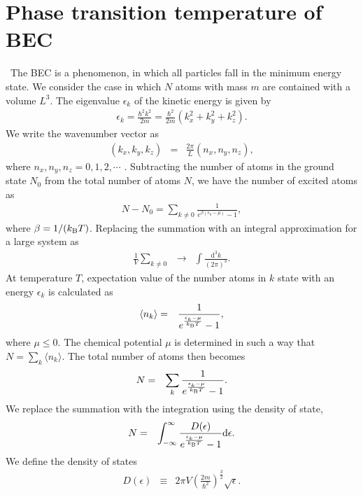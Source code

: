\documentclass[12pt,a4paper]{report}
\newcommand{\diff}{\mathrm{d}}				            %
\newcommand{\kb} {k_{\rm B}}				            %
\begin{document}
\section{Phase transition temperature of BEC}
\ The BEC is a phenomenon, in which all particles fall in the minimum energy state.
We consider the case in which $N$ atoms with mass $m$ are contained with a volume $L^3$.
The eigenvalue $\epsilon_k$ of the kinetic energy is given by
\begin{eqnarray}
\epsilon_k = \frac{\hbar^2 k^2}{2m} = \frac{\hbar^2}{2m}(k_x^2+k_y^2+k_z^2).
\end{eqnarray}
We write the wavenumber vector as
\begin{eqnarray}
(k_x, k_y, k_z) & = & \frac{2 \pi}{L}(n_x, n_y, n_z),
\end{eqnarray}
where $n_x,n_y,n_z = 0, 1, 2, \cdots$ .
Subtracting the number of atoms in the ground state $N_0$ from the total number of atoms $N$,
we have the number of excited atoms as
\begin{eqnarray}
N - N_0 = \sum_{k \neq 0} \frac{1}{ e^{\beta (\epsilon_k - \mu)} - 1},
\end{eqnarray}
where $\beta = 1/(\kb T)$.
Replacing the summation with an integral approximation for a large system as
\begin{eqnarray}
\frac{1}{V} \sum_{k \neq 0} & \rightarrow & \int \frac{\diff^3 k}{(2 \pi)^3}.
\end{eqnarray}
At temperature $T$, expectation value of the number atoms in $k$ state
with an energy $\epsilon_k$ is calculated as
\begin{eqnarray}
\langle n_k \rangle & = & \frac{1}{e^{\frac{\epsilon_k - \mu}{\kb T}} - 1},
\end{eqnarray}
where $\mu \leq 0$. The chemical potential $\mu$ is determined in
such a way that $N = \sum_k \langle n_k \rangle$.
The total number of atoms then becomes
\begin{eqnarray}
N & = & \sum_k \frac{1}{e^{\frac{\epsilon_k - \mu}{\kb T}} - 1}.
\end{eqnarray}
We replace the summation with the integration using the density of state,
\begin{eqnarray}
N & = & \int_{-\infty}^{\infty} \frac{ D(\epsilon)}{e^{\frac{\epsilon_k - \mu}{\kb T}} - 1}  \diff \epsilon.
\end{eqnarray}
We define the density of states
\begin{eqnarray}
D(\epsilon) & \equiv & 2 \pi V \left( \frac{2m}{\hbar^2} \right)^{\frac{3}{2}} \sqrt{\epsilon}.
\end{eqnarray}
\end{document}
